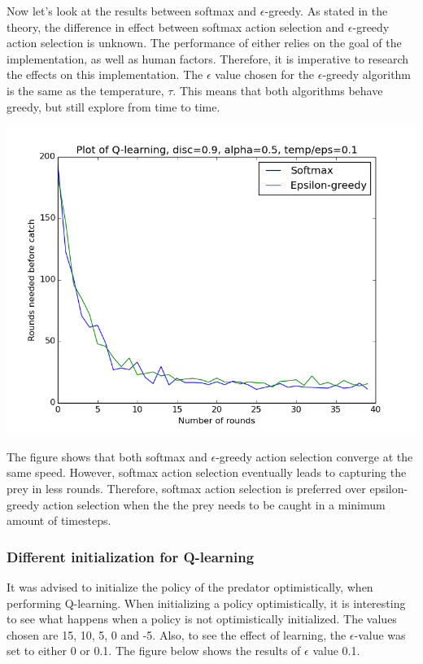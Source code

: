\documentclass{article}
\begin{document}
Now let's look at the results between softmax and $\epsilon$-greedy. As stated in the theory, the difference in effect between softmax action selection and $\epsilon$-greedy action selection is unknown. The performance of either relies on the goal of the implementation, as well as human factors. Therefore, it is imperative to research the effects on this implementation. The $\epsilon$ value chosen for the $\epsilon$-greedy algorithm is the same as the temperature, $\tau$. This means that both algorithms behave greedy, but still explore from time to time.

\begin{center}
	\includegraphics[scale=0.4]{softmax_vs_egreedy}
\end{center}

The figure shows that both softmax and $\epsilon$-greedy action selection converge at the same speed. However, softmax action selection eventually leads to capturing the prey in less rounds. Therefore, softmax action selection is preferred over epsilon-greedy action selection when the the prey needs to be caught in a minimum amount of timesteps.


\subsubsection{Different initialization for Q-learning}
It was advised to initialize the policy of the predator optimistically, when performing Q-learning. When initializing a policy optimistically, it is interesting to see what happens when a policy is not optimistically initialized. The values chosen are 15, 10, 5, 0 and -5. Also, to see the effect of learning, the $\epsilon$-value was set to either 0 or 0.1. The figure below shows the results of $\epsilon$ value 0.1.
\end{document}
